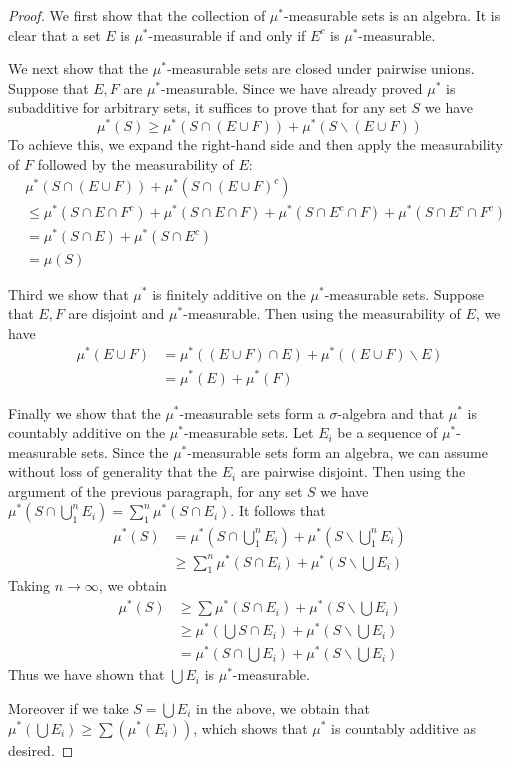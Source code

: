 \documentclass[11pt,oneside]{amsbook}
\renewcommand{\setminus}{\smallsetminus}
\theoremstyle{definition}
\theoremstyle{plain}
\theoremstyle{definition}
\theoremstyle{remark}
\numberwithin{equation}{section}
\numberwithin{figure}{section}
\begin{document}
\begin{proof}
  We first show that the collection of $\mu^*$-measurable sets is an algebra. It is clear that a set $E$ is $\mu^*$-measurable if and only if $E^c$ is $\mu^*$-measurable.

  We next show that the $\mu^*$-measurable sets are closed under pairwise unions. Suppose that $E,F$ are $\mu^*$-measurable. Since we have already proved $\mu^*$ is subadditive for arbitrary sets, it suffices to prove that for any set $S$ we have
  \[\mu^*(S)\geq\mu^*(S\cap(E\cup F))+\mu^*(S\setminus(E\cup F))
  \]
  To achieve this, we expand the right-hand side and then apply the measurability of $F$ followed by the measurability of $E$:
  \begin{align*}
    &\mu^*(S\cap(E\cup F))+\mu^*(S\cap(E\cup F)^c)\\
    &\leq \mu^*(S\cap E\cap F^c)+\mu^*(S\cap E\cap F)+\mu^*(S\cap E^c\cap F)+\mu^*(S\cap E^c\cap F^c)\\
    &=\mu^*(S\cap E)+\mu^*(S\cap E^c)\\
    &=\mu(S)
  \end{align*}
  
  Third we show that $\mu^*$ is finitely additive on the $\mu^*$-measurable sets. Suppose that $E,F$ are disjoint and $\mu^*$-measurable. Then using the measurability of $E$, we have
  \begin{align*}
    \mu^*(E\cup F)&=\mu^*((E\cup F)\cap E)+\mu^*((E\cup F)\setminus E)\\
                  &=\mu^*(E)+\mu^*(F)
  \end{align*}

  Finally we show that the $\mu^*$-measurable sets form a $\sigma$-algebra and that $\mu^*$ is countably additive on the $\mu^*$-measurable sets. Let $E_i$ be a sequence of $\mu^*$-measurable sets. Since the $\mu^*$-measurable sets form an algebra, we can assume without loss of generality that the $E_i$ are pairwise disjoint. Then using the argument of the previous paragraph, for any set $S$ we have $\mu^*(S\cap\bigcup_1^nE_i)=\sum_1^n\mu^*(S\cap E_i)$. It follows that
  \begin{align*}
    \mu^*(S)&=\mu^*(S\cap\bigcup_1^nE_i)+\mu^*(S\setminus\bigcup_1^nE_i)\\
            &\geq\sum_1^n\mu^*(S\cap E_i)+\mu^*(S\setminus\bigcup E_i)
  \end{align*}
  Taking $n\to\infty$, we obtain
  \begin{align*}
    \mu^*(S)&\geq\sum\mu^*(S\cap E_i)+\mu^*(S\setminus\bigcup E_i)\\
            &\geq\mu^*(\bigcup S\cap E_i)+\mu^*(S\setminus\bigcup E_i)\\
            &=\mu^*(S\cap\bigcup E_i)+\mu^*(S\setminus\bigcup E_i)
  \end{align*}
  Thus we have shown that $\bigcup E_i$ is $\mu^*$-measurable.

  Moreover if we take $S=\bigcup E_i$ in the above, we obtain that $\mu^*(\bigcup E_i)\geq\sum(\mu^*(E_i))$, which shows that $\mu^*$ is countably additive as desired.
\end{proof}
\end{document}
